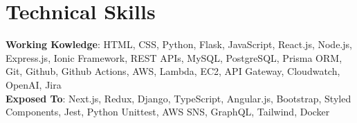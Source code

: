 \documentclass[letterpaper,11pt]{article}
\makeatletter
\newcommand{\resumeSubheading}[4]{
  \vspace{-2pt}\item
    \begin{tabular*}{0.97\textwidth}[t]{l@{\extracolsep{\fill}}r}
      \textbf{#1} & #2 \\
      \textit{\small#3} & \textit{\small #4} \\
    \end{tabular*}\vspace{-7pt}
}
\newcommand{\resumeSubHeadingListStart}{\begin{itemize}[leftmargin=0.15in, label={}]}
\newcommand{\resumeSubHeadingListEnd}{\end{itemize}}
\makeatother
\begin{document}
\section{Technical Skills}
 \begin{itemize}[leftmargin=0.15in, label={}]
    \footnotesize{\item{
     \textbf{Working Kowledge}{: HTML, CSS, Python, Flask, JavaScript, React.js, Node.js, Express.js, Ionic Framework, REST APIs, MySQL, PostgreSQL, Prisma ORM, Git, Github, Github Actions, AWS, Lambda, EC2, API Gateway, Cloudwatch, OpenAI, Jira } \\
     \vspace{4pt} 
     \textbf{Exposed To}{: Next.js, Redux, Django, TypeScript, Angular.js, Bootstrap, Styled Components, Jest, Python Unittest, AWS SNS, GraphQL, Tailwind, Docker} \\ 
    }}
 \end{itemize} 




 \vspace{1pt}
\end{document}
